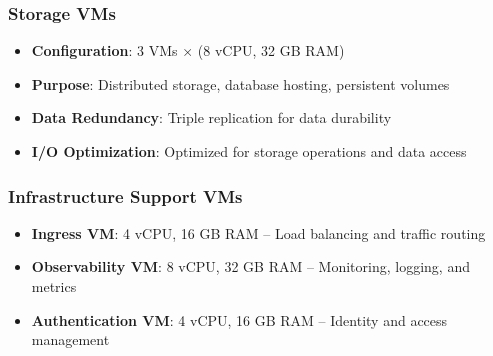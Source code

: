 \documentclass[12pt]{report}
\begin{document}
\subsubsection{Storage VMs}
\begin{itemize}
  \item \textbf{Configuration}: 3 VMs × (8 vCPU, 32 GB RAM)
  \item \textbf{Purpose}: Distributed storage, database hosting, persistent volumes
  \item \textbf{Data Redundancy}: Triple replication for data durability
  \item \textbf{I/O Optimization}: Optimized for storage operations and data access
\end{itemize}

\subsubsection{Infrastructure Support VMs}
\begin{itemize}
  \item \textbf{Ingress VM}: 4 vCPU, 16 GB RAM -- Load balancing and traffic routing
  \item \textbf{Observability VM}: 8 vCPU, 32 GB RAM -- Monitoring, logging, and metrics
  \item \textbf{Authentication VM}: 4 vCPU, 16 GB RAM -- Identity and access management
\end{itemize}
\end{document}
